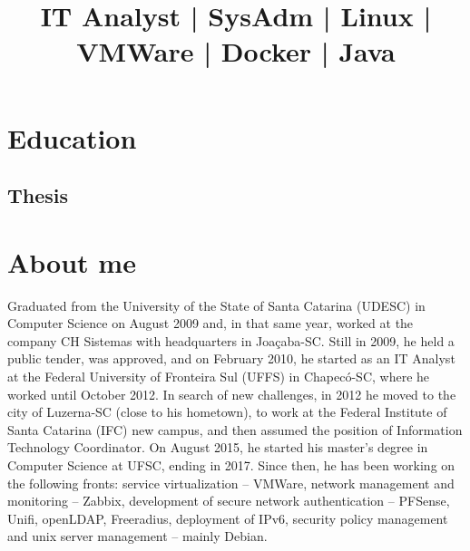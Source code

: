 \documentclass[11pt,a4paper,sans]{moderncv} %
\title{IT Analyst | SysAdm | Linux | VMWare | Docker | Java}
\begin{document}
\thispagestyle{empty}

\makecvtitle %


\section{Education}


\subsection{Thesis}


\section{About me}

Graduated from the University of the State of Santa Catarina (UDESC) in Computer Science on August 2009 and, in that same year, worked at the company CH Sistemas with headquarters in Joaçaba-SC. Still in 2009, he held a public tender, was approved, and on February 2010, he started as an IT Analyst at the Federal University of Fronteira Sul (UFFS) in Chapecó-SC, where he worked until October 2012. In search of new challenges, in 2012 he moved to the city of Luzerna-SC (close to his hometown), to work at the Federal Institute of Santa Catarina (IFC) new campus, and then assumed the position of Information Technology Coordinator. On August 2015, he started his master's degree in Computer Science at UFSC, ending in 2017. Since then, he has been working on the following fronts: service virtualization -- VMWare, network management and monitoring -- Zabbix, development of secure network authentication -- PFSense, Unifi, openLDAP, Freeradius, deployment of IPv6, security policy management and unix server management -- mainly Debian.
\end{document}
